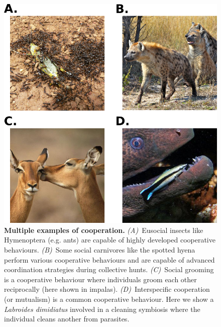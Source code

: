     

    \begin{figure}[hbt]
        \begin{center}
          \includegraphics[scale = 0.5]{fig/Intro/CooperationExamples.png}
          \caption{\textbf{Multiple examples of cooperation.} {\em (A)}~Eusocial insects like Hymenoptera (e.g. ants) are capable of highly developed cooperative behaviours. {\em (B)}~Some social carnivores like the spotted hyena perform various cooperative behaviours and are capable of advanced coordination strategies during collective hunts. {\em (C)}~Social grooming is a cooperative behaviour where individuals groom each other reciprocally (here shown in impalas). {\em (D)}~Interspecific cooperation (or mutualism) is a common cooperative behaviour. Here we show a \emph{Labroides dimidiatus} involved in a cleaning symbiosis where the individual cleans another from parasites.}
          \label{fig:CooperationExamples}
        \end{center}
    \end{figure}

